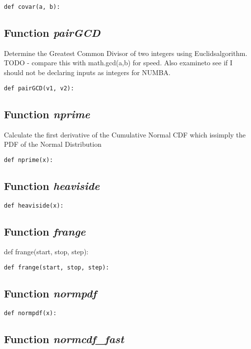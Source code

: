 \documentclass[twoside,11pt]{book}
\begin{document}
\begin{lstlisting}
def covar(a, b):
\end{lstlisting}

\subsection{Function {\it pairGCD}}
Determine the Greatest Common Divisor of two integers using Euclidsalgorithm. TODO - compare this with math.gcd(a,b) for speed. Also examineto see if I should not be declaring inputs as integers for NUMBA. 

\begin{lstlisting}
def pairGCD(v1, v2):
\end{lstlisting}

\subsection{Function {\it nprime}}
Calculate the first derivative of the Cumulative Normal CDF which issimply the PDF of the Normal Distribution 

\begin{lstlisting}
def nprime(x):
\end{lstlisting}

\subsection{Function {\it heaviside}}


\begin{lstlisting}
def heaviside(x):
\end{lstlisting}

\subsection{Function {\it frange}}
def frange(start, stop, step):

\begin{lstlisting}
def frange(start, stop, step):
\end{lstlisting}

\subsection{Function {\it normpdf}}


\begin{lstlisting}
def normpdf(x):
\end{lstlisting}

\subsection{Function {\it normcdf\_fast}}
\end{document}
